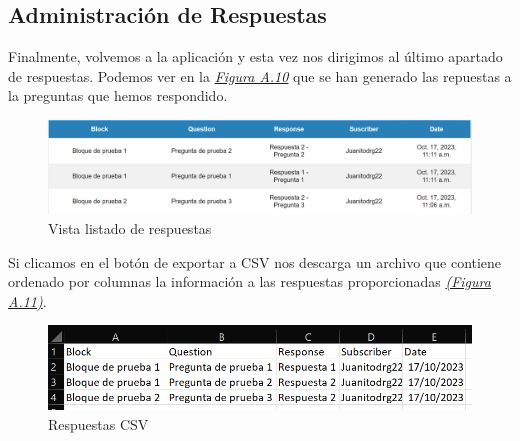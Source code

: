 \subsection{Administración de Respuestas}

Finalmente, volvemos a la aplicación y esta vez nos dirigimos al último apartado de respuestas. Podemos ver en la \textit{\hyperref[fig:listado_respuestas]{Figura A.10}} que se han generado las repuestas a la preguntas que hemos respondido. 

\begin{figure}[!ht]
    \centering
    \includegraphics[width=1\textwidth]{imagenes/respuestas.png}
    \caption{ Vista listado de respuestas }
    \label{fig:listado_respuestas}
\end{figure}\vspace{0.5cm}

Si clicamos en el botón de exportar a CSV nos descarga un archivo que contiene ordenado por columnas la información a las respuestas proporcionadas \textit{\hyperref[fig:respuestas-csv]{(Figura A.11)}}. 

\begin{figure}[!ht]
    \centering
    \includegraphics[width=1\textwidth]{imagenes/respuestas_csv.png}
    \caption{ Respuestas CSV }
    \label{fig:respuestas-csv}
\end{figure}\vspace{0.5cm}